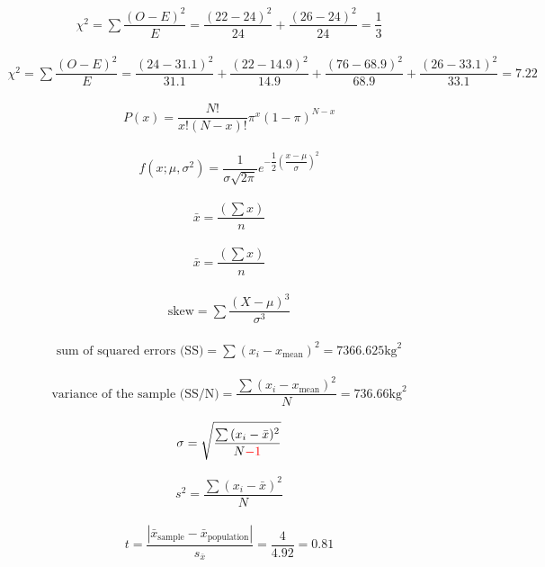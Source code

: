 \documentclass{article}
\begin{document}
\begin{align*}
\chi^2=\sum{\dfrac{(O-E)^2}{E}}=\dfrac{(22-24)^2}{24}+\dfrac{(26-24)^2}{24}=\dfrac{1}{3}
\end{align*}

\begin{align*}
\chi^2=\sum{\dfrac{(O-E)^2}{E}}=\dfrac{(24-31.1)^2}{31.1}+\dfrac{(22-14.9)^2}{14.9}+\dfrac{(76-68.9)^2}{68.9}+\dfrac{(26-33.1)^2}{33.1}=7.22
\end{align*}

\begin{align*}
P(x)=\dfrac{N!}{x!(N-x)!}\pi^x(1-\pi)^{N-x}
\end{align*}

\begin{align*}
f(x;\mu,\sigma^2)=\dfrac{1}{\sigma\sqrt{2\pi}}e^{-\dfrac{1}{2}(\dfrac{x-\mu}{\sigma})^2}
\end{align*}

\begin{align*}
\bar{x}=\dfrac{(\sum{x})}{n}
\end{align*}

\begin{align*}
\bar{x}=\dfrac{(\sum{x})}{n}
\end{align*}

\begin{align*}
\text{skew}=\sum{\dfrac{(X-\mu)^3}{\sigma^3}}
\end{align*}

\begin{align*}
\text{sum of squared errors (SS)}=\sum{(x_i-x_{\text{mean}})^2}=7366.625\text{kg}^2
\end{align*}

\begin{align*}
\text{variance of the sample (SS/N)}=\dfrac{\sum{(x_i-x_{\text{mean}})^2}}{N}=736.66\text{kg}^2
\end{align*}

\begin{align*}
\sigma=\sqrt{\dfrac{\sum{(x_i-\bar{x})^2}}{N\textcolor{red}{-1}}}
\end{align*}

\begin{align*}
s^2=\dfrac{\sum{(x_i-\bar{x})^2}}{N}
\end{align*}

\begin{align*}
t=\dfrac{|\bar{x}_{\text{sample}}-\bar{x}_{\text{population}}|}{s_{\bar{x}}}=\dfrac{4}{4.92}=0.81
\end{align*}
\end{document}
